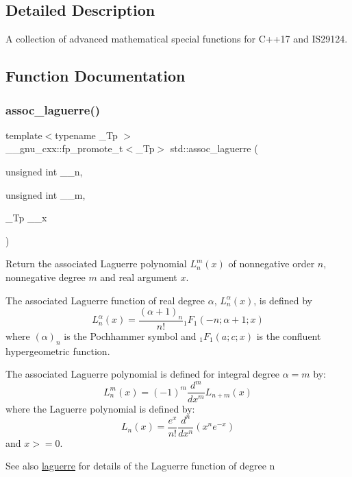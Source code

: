 \subsection{Detailed Description}
A collection of advanced mathematical special functions for C++17 and I\+S29124. 

\subsection{Function Documentation}
\mbox{\label{group__tr29124__math__spec__func_ga0b33e0ac3066f2353861ce2f34b43f57}} 
\subsubsection{\texorpdfstring{assoc\+\_\+laguerre()}{assoc\_laguerre()}}
{\footnotesize\ttfamily template$<$typename \+\_\+\+Tp $>$ \\
\+\_\+\+\_\+gnu\+\_\+cxx\+::fp\+\_\+promote\+\_\+t$<$\+\_\+\+Tp$>$ std\+::assoc\+\_\+laguerre (\begin{DoxyParamCaption}\item[{unsigned int}]{\+\_\+\+\_\+n,  }\item[{unsigned int}]{\+\_\+\+\_\+m,  }\item[{\+\_\+\+Tp}]{\+\_\+\+\_\+x }\end{DoxyParamCaption})\hspace{0.3cm}{\ttfamily [inline]}}

Return the associated Laguerre polynomial $ L_n^m(x) $ of nonnegative order $ n $, nonnegative degree $ m $ and real argument $ x $.

The associated Laguerre function of real degree $ \alpha $, $ L_n^\alpha(x) $, is defined by \[ L_n^\alpha(x) = \frac{(\alpha + 1)_n}{n!} {}_1F_1(-n; \alpha + 1; x) \] where $ (\alpha)_n $ is the Pochhammer symbol and $ {}_1F_1(a; c; x) $ is the confluent hypergeometric function.

The associated Laguerre polynomial is defined for integral degree $ \alpha = m $ by\+: \[ L_n^m(x) = (-1)^m \frac{d^m}{dx^m} L_{n + m}(x) \] where the Laguerre polynomial is defined by\+: \[ L_n(x) = \frac{e^x}{n!} \frac{d^n}{dx^n} (x^ne^{-x}) \] and $ x >= 0 $. \begin{DoxySeeAlso}{See also}
\hyperlink{group__tr29124__math__spec__func_ga9d7b24a11dad27690387405548973ef9}{laguerre} for details of the Laguerre function of degree {\ttfamily n} 
\end{DoxySeeAlso}

